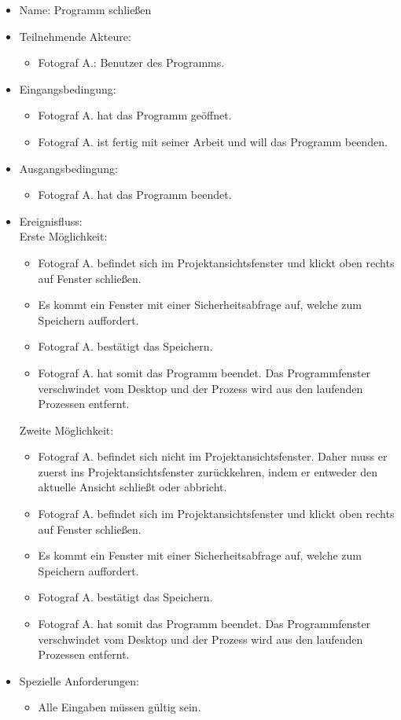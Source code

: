 	\begin{itemize}
		\item Name: Programm schließen
		\item Teilnehmende Akteure:
		\begin{itemize}
			\item	Fotograf A.: Benutzer des Programms.
		\end{itemize}
		\item Eingangsbedingung:
		\begin{itemize}
			\item Fotograf A. hat das Programm geöffnet.
			\item Fotograf A. ist fertig mit seiner Arbeit und will das Programm beenden.						
		\end{itemize}
		\item Ausgangsbedingung:
		\begin{itemize}
			\item	Fotograf A. hat das Programm beendet.		
		\end{itemize}
		\item Ereignisfluss:\\Erste Möglichkeit:	
		\begin{itemize}
			\item Fotograf A. befindet sich im Projektansichtsfenster und klickt oben rechts auf Fenster schließen.
			\item Es kommt ein Fenster mit einer Sicherheitsabfrage auf, welche zum Speichern auffordert.
			\item Fotograf A. bestätigt das Speichern.
			\item Fotograf A. hat somit das Programm beendet. Das Programmfenster verschwindet vom Desktop und der Prozess wird aus den laufenden Prozessen entfernt.
		\end{itemize}
		Zweite Möglichkeit:
		\begin{itemize}
			\item Fotograf A. befindet sich nicht im Projektansichtsfenster. Daher muss er zuerst ins Projektansichtsfenster zurückkehren, indem er entweder den aktuelle Ansicht schließt oder abbricht.
			\item Fotograf A. befindet sich im Projektansichtsfenster und klickt oben rechts auf Fenster schließen.
			\item Es kommt ein Fenster mit einer Sicherheitsabfrage auf, welche zum Speichern auffordert.
			\item Fotograf A. bestätigt das Speichern.
			\item Fotograf A. hat somit das Programm beendet. Das Programmfenster verschwindet vom Desktop und der Prozess wird aus den laufenden Prozessen entfernt.
		\end{itemize}	
		\item Spezielle Anforderungen:
		\begin{itemize}
			\item	Alle Eingaben müssen gültig sein.		
		\end{itemize}
	\end{itemize}
	
